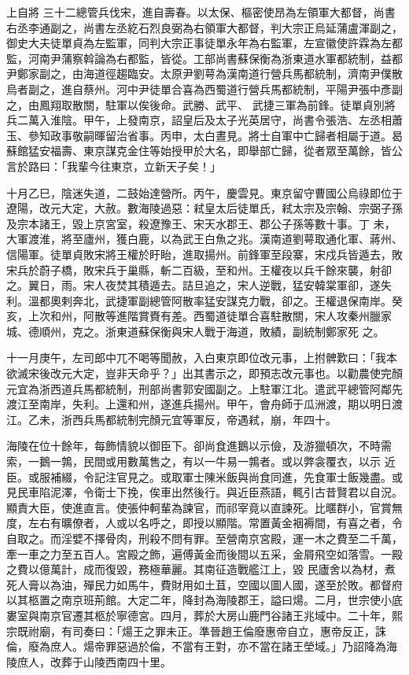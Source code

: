 \begin{pinyinscope}
 上自將
 三十二總管兵伐宋，進自壽春。以太保、樞密使昂為左領軍大都督，尚書右丞李通副之，尚書左丞紇石烈良弼為右領軍大都督，判大宗正烏延蒲盧渾副之，御史大夫徒單貞為左監軍，同判大宗正事徒單永年為右監軍，左宣徽使許霖為左都監，河南尹蒲察斡論為右都監，皆從。工部尚書蘇保衡為浙東道水軍都統制，益都尹鄭家副之，由海道徑趨臨安。太原尹劉萼為漢南道行營兵馬都統制，濟南尹僕散烏者副之，進自蔡州。河中尹徒單合喜為西蜀道行營兵馬都統制，平陽尹張中彥副之，由鳳翔取散關，駐軍以俟後命。武勝、武平、
 武捷三軍為前鋒。徒單貞別將兵二萬入淮陰。甲午，上發南京，詔皇后及太子光英居守，尚書令張浩、左丞相蕭玉、參知政事敬嗣暉留治省事。丙申，太白晝見。將士自軍中亡歸者相屬于道。曷蘇館猛安福壽、東京謀克金住等始授甲於大名，即舉部亡歸，從者眾至萬餘，皆公言於路曰：「我輩今往東京，立新天子矣！」



 十月乙巳，陰迷失道，二鼓始達營所。丙午，慶雲見。東京留守曹國公烏祿即位于遼陽，改元大定，大赦。數海陵過惡：弒皇太后徒單氏，弒太宗及宗翰、宗弼子孫及宗本諸王，毀上京宮室，殺遼豫王、宋天水郡王、郡公子孫等數十事。丁
 未，大軍渡淮，將至廬州，獲白鹿，以為武王白魚之兆。漢南道劉萼取通化軍、蔣州、信陽軍。徒單貞敗宋將王權於盱眙，進取揚州。前鋒軍至段寨，宋戍兵皆遁去，敗宋兵於蔚子橋，敗宋兵于巢縣，斬二百級，至和州。王權夜以兵千餘來襲，射卻之。翼日，雨。宋人夜焚其積遁去。詰旦追之，宋人逆戰，猛安韓棠軍卻，遂失利。溫都奧剌奔北，武捷軍副總管阿散率猛安謀克力戰，卻之。王權退保南岸。癸亥，上次和州，阿散等進階賞賚有差。西蜀道徒單合喜駐散關，宋人攻秦州臘家城、德順州，克之。浙東道蘇保衡與宋人戰于海道，敗績，副統制鄭家死
 之。



 十一月庚午，左司郎中兀不喝等聞赦，入白東京即位改元事，上拊髀歎曰：「我本欲滅宋後改元大定，豈非天命乎？」出其書示之，即預志改元事也。以勸農使完顏元宜為浙西道兵馬都統制，刑部尚書郭安國副之。上駐軍江北。遣武平總管阿鄰先渡江至南岸，失利。上還和州，遂進兵揚州。甲午，會舟師于瓜洲渡，期以明日渡江。乙未，浙西兵馬都統制完顏元宜等軍反，帝遇弒，崩，年四十。



 海陵在位十餘年，每飾情貌以御臣下。卻尚食進鵝以示儉，及游獵頓次，不時需索，一鵝一鶉，民間或用數萬售之，有以一牛易一鶉者。或以弊衾覆衣，以示
 近臣。或服補綴，令記注官見之。或取軍士陳米飯與尚食同進，先食軍士飯幾盡。或見民車陷泥澤，令衛士下挽，俟車出然後行。與近臣燕語，輒引古昔賢君以自況。顯責大臣，使進直言。使張仲軻輩為諫官，而祁宰竟以直諫死。比暱群小，官賞無度，左右有曠僚者，人或以名呼之，即授以顯階。常置黃金裀褥間，有喜之者，令自取之。而淫嬖不擇骨肉，刑殺不問有罪。至營南京宮殿，運一木之費至二千萬，牽一車之力至五百人。宮殿之飾，遍傅黃金而後間以五采，金屑飛空如落雪。一殿之費以億萬計，成而復毀，務極華麗。其南征造戰艦江上，毀
 民廬舍以為材，煮死人膏以為油，殫民力如馬牛，費財用如土苴，空國以圖人國，遂至於敗。都督府以其柩置之南京班荊館。大定二年，降封為海陵郡王，謚曰煬。二月，世宗使小底婁室與南京官遷其柩於寧德宮。四月，葬於大房山鹿門谷諸王兆域中。二十年，熙宗既祔廟，有司奏曰：「煬王之罪未正。準晉趙王倫廢惠帝自立，惠帝反正，誅倫，廢為庶人。煬帝罪惡過於倫，不當有王對，亦不當在諸王塋域。」乃詔降為海陵庶人，改葬于山陵西南四十里。




\end{pinyinscope}

